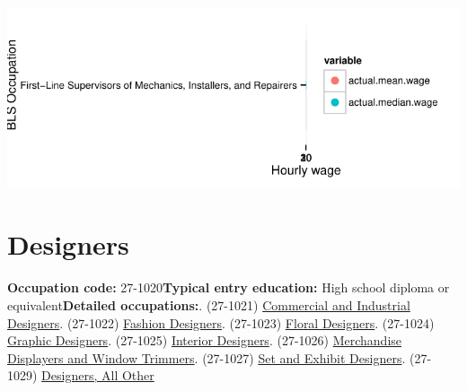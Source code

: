 \documentclass[a4paper,10pt]{article}\usepackage[]{graphicx}\usepackage[]{color}
\makeatletter
\def\maxwidth{ %
  \ifdim\Gin@nat@width>\linewidth
    \linewidth
  \else
    \Gin@nat@width
  \fi
}
\makeatother
\begin{document}
{\centering \includegraphics[width=\maxwidth]{figure/unnamed-chunk-280} 

}


\newpage\section{Designers}\textbf{Occupation code:} 27-1020\newline\textbf{Typical entry education:} High school diploma or equivalent\newline\textbf{Detailed occupations:}. (27-1021)  \href{http://www.bls.gov/oes/current/oes271021.htm}{Commercial and Industrial Designers}. (27-1022)  \href{http://www.bls.gov/oes/current/oes271022.htm}{Fashion Designers}. (27-1023)  \href{http://www.bls.gov/oes/current/oes271023.htm}{Floral Designers}. (27-1024)  \href{http://www.bls.gov/oes/current/oes271024.htm}{Graphic Designers}. (27-1025)  \href{http://www.bls.gov/oes/current/oes271025.htm}{Interior Designers}. (27-1026)  \href{http://www.bls.gov/oes/current/oes271026.htm}{Merchandise Displayers and Window Trimmers}. (27-1027)  \href{http://www.bls.gov/oes/current/oes271027.htm}{Set and Exhibit Designers}. (27-1029)  \href{http://www.bls.gov/oes/current/oes271029.htm}{Designers, All Other}\newline%
\end{document}
